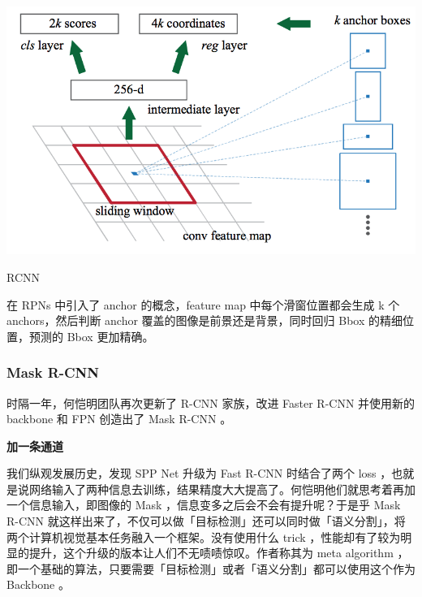 \begin{uscfigure}
	\includegraphics[width=\textwidth]{./Pictures/faster_rcnn_anchor.png}	
	\caption{RCNN}	
\end{uscfigure}
在 RPNs 中引入了 anchor 的概念，feature map 中每个滑窗位置都会生成 k 个 anchors，然后判断 anchor 覆盖的图像是前景还是背景，同时回归 Bbox 的精细位置，预测的 Bbox 更加精确。
\subsubsection{Mask R-CNN}
时隔一年，何恺明团队再次更新了 R-CNN 家族，改进 Faster R-CNN 并使用新的 backbone 和 FPN 创造出了 Mask R-CNN 。

\textbf{加一条通道}

我们纵观发展历史，发现 SPP Net 升级为 Fast R-CNN 时结合了两个 loss ，也就是说网络输入了两种信息去训练，结果精度大大提高了。何恺明他们就思考着再加一个信息输入，即图像的 Mask ，信息变多之后会不会有提升呢？于是乎 Mask R-CNN 就这样出来了，不仅可以做「目标检测」还可以同时做「语义分割」，将两个计算机视觉基本任务融入一个框架。没有使用什么 trick ，性能却有了较为明显的提升，这个升级的版本让人们不无啧啧惊叹。作者称其为 meta algorithm ，即一个基础的算法，只要需要「目标检测」或者「语义分割」都可以使用这个作为 Backbone 。


